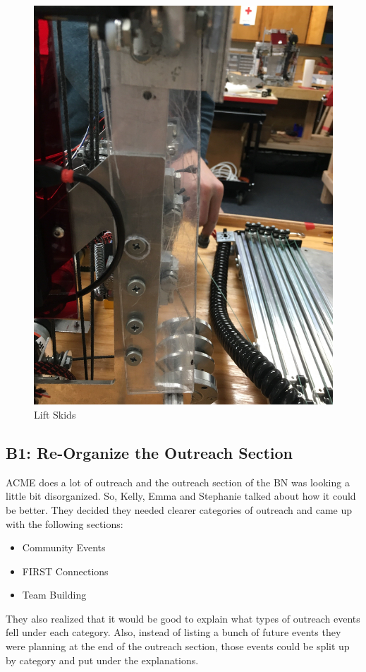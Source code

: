 \documentclass{article}
\begin{document}
\begin{figure}
    \centering
    \includegraphics[width=.6 \textwidth]{21_01-21/images/liftskids.JPG}
    \caption{Lift Skids}
    \label{fig:skids}
\end{figure}
\subsection{B1: Re-Organize the Outreach Section}

ACME does a lot of outreach and the outreach section of the BN was looking a little bit disorganized. So, Kelly, Emma and Stephanie talked about how it could be better. They decided they needed clearer categories of outreach and came up with the following sections: 

\begin{itemize}
    \item Community Events
    \item FIRST Connections
    \item Team Building
\end{itemize}

They also realized that it would be good to explain what types of outreach events fell under each category. Also, instead of listing a bunch of future events they were planning at the end of the outreach section, those events could be split up by category and put under the explanations. \\
\end{document}
